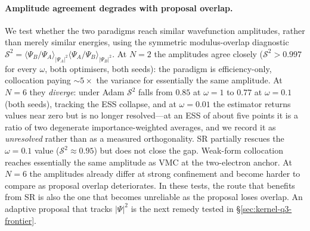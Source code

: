\paragraph{Amplitude agreement degrades with proposal overlap.} We test whether the two
paradigms reach similar wavefunction amplitudes, rather than merely similar energies, using
the symmetric modulus-overlap diagnostic
$\mathcal{S}^2=\langle\Psi_B/\Psi_A\rangle_{|\Psi_A|^2}
\langle\Psi_A/\Psi_B\rangle_{|\Psi_B|^2}$. At $N=2$ the amplitudes agree closely
($\mathcal{S}^2>0.997$ for every $\omega$, both optimisers, both seeds): the paradigm
is efficiency-only, collocation paying $\sim\!5\times$ the variance for essentially the
same amplitude. At $N=6$ they \emph{diverge}: under Adam $\mathcal{S}^2$ falls from $0.85$ at $\omega=1$ to
$0.77$ at $\omega=0.1$ (both seeds), tracking the ESS collapse, and at $\omega=0.01$ the
estimator returns values near zero but is no longer resolved---at an ESS of about five
points it is a ratio of two degenerate importance-weighted averages, and we record it as
\emph{unresolved} rather than as a measured orthogonality. SR partially rescues the
$\omega=0.1$ value ($\mathcal{S}^2\!\approx\!0.95$) but does not close the gap. Weak-form
collocation reaches essentially the same amplitude as VMC at the two-electron anchor. At $N=6$
the amplitudes already differ at strong confinement and become harder to compare as proposal
overlap deteriorates.
In these tests, the route that benefits from SR is also the one that becomes unreliable as
the proposal loses overlap. An adaptive proposal that tracks $|\Psi|^2$ is the next remedy tested in
\S\ref{sec:kernel-q3-frontier}.

